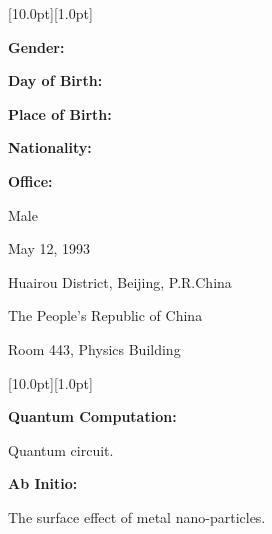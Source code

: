 \documentclass[12pt,a4paper,utf8]{report}
\begin{document}
\begin{minipage}[t]{16cm}
    \colorbox{subtitlecolor}{\raisebox{0pt}[10.0pt][1.0pt]{
        \textcolor{white}{\textsf{}}}}
\end{minipage}\par
\vspace{0.2cm}
    \begin{minipage}[t]{4cm}
        \qquad \textbf{Gender:}\par
        \qquad \textbf{Day of Birth:}\par
        \qquad \textbf{Place of Birth:}\par
        \qquad \textbf{Nationality:}\par
        \qquad \textbf{Office:}\par
    \end{minipage}
    \begin{minipage}[t]{12cm}
        Male \par
        May 12, 1993 \par
        Huairou District, Beijing, P.R.China \par
        The People's Republic of China \par
        Room 443, Physics Building \par
    \end{minipage}\par
\vspace{0.4cm}

\begin{minipage}[t]{16cm}
    \colorbox{subtitlecolor}{\raisebox{0pt}[10.0pt][1.0pt]{
        \textcolor{white}{\textsf{}}}}
\end{minipage}\par
\vspace{0.2cm}\hspace{0.5cm}
    \begin{minipage}[t]{15.0cm}
        {\textbf{Quantum Computation:}}\par
        \quad Quantum circuit. \par
    \vspace{0.2cm}
        {\textbf{Ab Initio:}}\par
        \quad The surface effect of metal nano-particles.
    \end{minipage}\par
\vspace{0.4cm}
\end{document}
